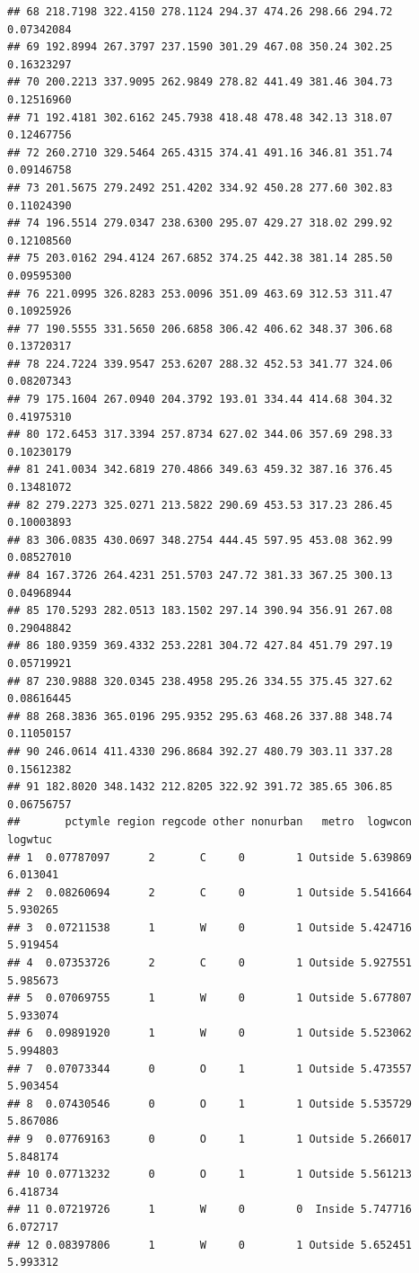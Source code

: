 \documentclass[]{article}
\begin{document}
\begin{verbatim}
## 68 218.7198 322.4150 278.1124 294.37 474.26 298.66 294.72 0.07342084
## 69 192.8994 267.3797 237.1590 301.29 467.08 350.24 302.25 0.16323297
## 70 200.2213 337.9095 262.9849 278.82 441.49 381.46 304.73 0.12516960
## 71 192.4181 302.6162 245.7938 418.48 478.48 342.13 318.07 0.12467756
## 72 260.2710 329.5464 265.4315 374.41 491.16 346.81 351.74 0.09146758
## 73 201.5675 279.2492 251.4202 334.92 450.28 277.60 302.83 0.11024390
## 74 196.5514 279.0347 238.6300 295.07 429.27 318.02 299.92 0.12108560
## 75 203.0162 294.4124 267.6852 374.25 442.38 381.14 285.50 0.09595300
## 76 221.0995 326.8283 253.0096 351.09 463.69 312.53 311.47 0.10925926
## 77 190.5555 331.5650 206.6858 306.42 406.62 348.37 306.68 0.13720317
## 78 224.7224 339.9547 253.6207 288.32 452.53 341.77 324.06 0.08207343
## 79 175.1604 267.0940 204.3792 193.01 334.44 414.68 304.32 0.41975310
## 80 172.6453 317.3394 257.8734 627.02 344.06 357.69 298.33 0.10230179
## 81 241.0034 342.6819 270.4866 349.63 459.32 387.16 376.45 0.13481072
## 82 279.2273 325.0271 213.5822 290.69 453.53 317.23 286.45 0.10003893
## 83 306.0835 430.0697 348.2754 444.45 597.95 453.08 362.99 0.08527010
## 84 167.3726 264.4231 251.5703 247.72 381.33 367.25 300.13 0.04968944
## 85 170.5293 282.0513 183.1502 297.14 390.94 356.91 267.08 0.29048842
## 86 180.9359 369.4332 253.2281 304.72 427.84 451.79 297.19 0.05719921
## 87 230.9888 320.0345 238.4958 295.26 334.55 375.45 327.62 0.08616445
## 88 268.3836 365.0196 295.9352 295.63 468.26 337.88 348.74 0.11050157
## 90 246.0614 411.4330 296.8684 392.27 480.79 303.11 337.28 0.15612382
## 91 182.8020 348.1432 212.8205 322.92 391.72 385.65 306.85 0.06756757
##       pctymle region regcode other nonurban   metro  logwcon  logwtuc
## 1  0.07787097      2       C     0        1 Outside 5.639869 6.013041
## 2  0.08260694      2       C     0        1 Outside 5.541664 5.930265
## 3  0.07211538      1       W     0        1 Outside 5.424716 5.919454
## 4  0.07353726      2       C     0        1 Outside 5.927551 5.985673
## 5  0.07069755      1       W     0        1 Outside 5.677807 5.933074
## 6  0.09891920      1       W     0        1 Outside 5.523062 5.994803
## 7  0.07073344      0       O     1        1 Outside 5.473557 5.903454
## 8  0.07430546      0       O     1        1 Outside 5.535729 5.867086
## 9  0.07769163      0       O     1        1 Outside 5.266017 5.848174
## 10 0.07713232      0       O     1        1 Outside 5.561213 6.418734
## 11 0.07219726      1       W     0        0  Inside 5.747716 6.072717
## 12 0.08397806      1       W     0        1 Outside 5.652451 5.993312

\end{verbatim}
\end{document}
